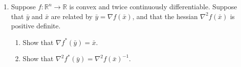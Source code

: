 \documentclass[12pt]{amsart}
\begin{document}
\begin{enumerate}
\vspace{2in}

{\bf Bonus: Don't work on this problem until you are done with the others. }

\item Suppose $f: \mathbb{R}^n \rightarrow \mathbb{R}$ is convex and twice continuously differentiable. Suppose that $\bar y$ and $\bar x$ 
are related by $\bar y = \nabla f(\bar x)$, and that the hessian $\nabla^2 f(\bar x)$ is positive definite. 

\begin{enumerate}
\item  Show that $\nabla f^* (\bar y) = \bar x$. 

\item Show that $\nabla^2 f^* (\bar y) = \nabla^2 f(\bar x)^{-1}$.

\end{enumerate}

\end{enumerate}
\end{document}
